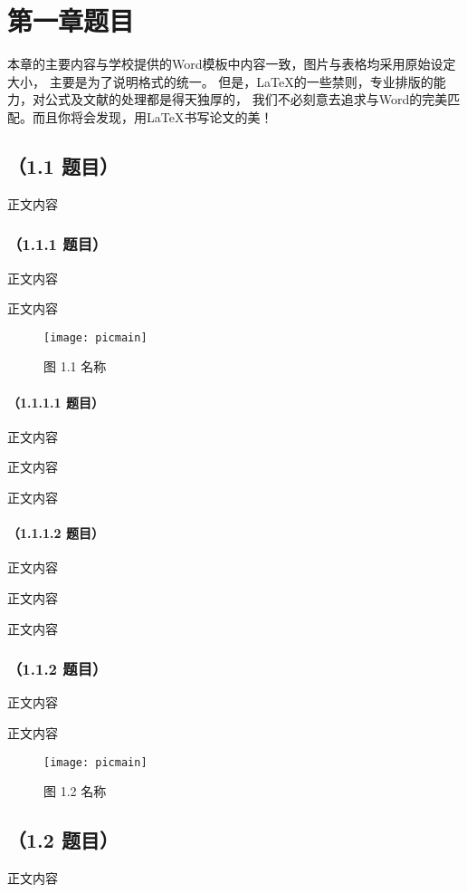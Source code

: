 \chapter{第一章题目}

本章的主要内容与学校提供的Word模板中内容一致，图片与表格均采用原始设定大小，%
主要是为了说明格式的统一。%
但是，\LaTeX{}的一些禁则，专业排版的能力，对公式及文献的处理都是得天独厚的，%
我们不必刻意去追求与Word的完美匹配。而且你将会发现，用\LaTeX{}书写论文的美！ %

\section{（1.1 题目）}
正文内容

\subsection{（1.1.1 题目）}
正文内容

正文内容

\begin{figure}[htp]
\centering
\texttt{[image: picmain]}
\caption{图 1.1 名称}
\end{figure}

\subsubsection{（1.1.1.1 题目）}
正文内容

正文内容

正文内容

\subsubsection{（1.1.1.2 题目）}
正文内容

正文内容

正文内容

\subsection{（1.1.2 题目）}
正文内容

正文内容

\begin{figure}[htp]
\centering
\texttt{[image: picmain]}
\caption{图 1.2 名称}
\end{figure}

\section{（1.2 题目）}
正文内容

